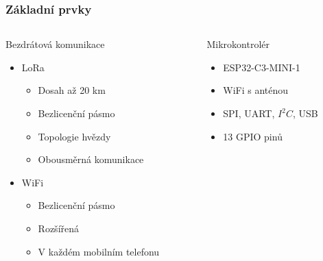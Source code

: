 \documentclass[%
  12pt,       				%
	t,                  %
	aspectratio=1610,   %
	unicode,						%
]{beamer}				    	%
\begin{document}
\begin{frame} 
	\frametitle{Základní prvky}
	
	\begin{columns}[T] 								%
		\begin{column}{0.5\textwidth}		%
			Bezdrátová komunikace
			\begin{itemize}
				\item LoRa
				\begin{itemize}
					\item Dosah až 20 km 
					\item Bezlicenční pásmo
					\item Topologie hvězdy 
					\item Obousměrná komunikace
				\end{itemize}
				\item WiFi
				\begin{itemize}
					\item Bezlicenční pásmo
					\item Rozšířená 
					\item V každém mobilním telefonu
				\end{itemize}
			\end{itemize}
		\end{column}
		\begin{column}{0.5\textwidth}		%
			Mikrokontrolér
			\begin{itemize}
				\item ESP32-C3-MINI-1
				\item WiFi s anténou 
				\item SPI, UART, $I^2C$, USB
				\item 13 GPIO pinů
			\end{itemize}
		\end{column}
	\end{columns}											%
\end{frame}
\end{document}
